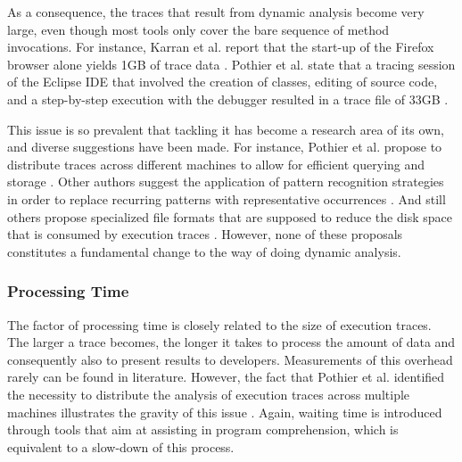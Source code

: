 As a consequence, the traces that result from dynamic analysis become very large, even though most tools only cover the bare sequence of method invocations.
For instance, Karran et al. report that the start-up of the Firefox browser alone yields 1GB of trace data \cite{karran_extraction_2013}.
Pothier et al. state that a tracing session of the Eclipse IDE that involved the creation of classes, editing of source code, and a step-by-step execution with the debugger resulted in a trace file of 33GB \cite{pothier_scalable_2007}.

This issue is so prevalent that tackling it has become a research area of its own, and diverse suggestions have been made.
For instance, Pothier et al. propose to distribute traces across different machines to allow for efficient querying and storage \cite{pothier_scalable_2007}.
Other authors suggest the application of pattern recognition strategies in order to  replace recurring patterns with representative occurrences \cite{de_pauw_execution_1998, systa_shimba_2001, richner_using_2002}.
And still others propose specialized file formats that are supposed to reduce the disk space that is consumed by execution traces \cite{johnson_lossless_1994, milenkovic_exploiting_2003}.
However, none of these proposals constitutes a fundamental change to the way of doing dynamic analysis.

\subsubsection{Processing Time}
The factor of processing time is closely related to the size of execution traces.
The larger a trace becomes, the longer it takes to process the amount of data and consequently also to present results to developers.
Measurements of this overhead rarely can be found in literature.
However, the fact that Pothier et al. identified the necessity to distribute the analysis of execution traces across multiple machines illustrates the gravity of this issue \cite{pothier_scalable_2007}.
Again, waiting time is introduced through tools that aim at assisting in program comprehension, which is equivalent to a slow-down of this process.

